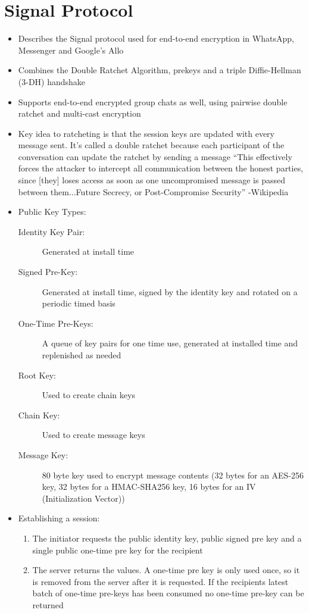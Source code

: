 \section{Signal Protocol}
\begin{itemize}
	\item Describes the Signal protocol used for end-to-end encryption in WhatsApp, Messenger and Google's Allo
	\item Combines the Double Ratchet Algorithm, prekeys and a triple Diffie-Hellman (3-DH) handshake
	\item Supports end-to-end encrypted group chats as well, using pairwise double ratchet and multi-cast encryption
	\item Key idea to ratcheting is that the session keys are updated with every message sent. It's called a double ratchet because each participant of the conversation can update the ratchet by sending a message
	\subitem ``This effectively forces the attacker to intercept all communication between the honest parties, since [they] loses access as soon as one uncompromised message is passed between them...Future Secrecy, or Post-Compromise Security'' -Wikipedia
	\item Public Key Types:
	\begin{description}
		\item[Identity Key Pair:] Generated at install time
		\item[Signed Pre-Key:] Generated at install time, signed by the identity key and rotated on a periodic timed basis
		\item[One-Time Pre-Keys:] A queue of key pairs for one time use, generated at installed time and replenished as needed
		\item[Root Key:] Used to create chain keys
		\item[Chain Key:] Used to create message keys
		\item[Message Key:] 80 byte key used to encrypt message contents (32 bytes for an AES-256 key, 32 bytes for a HMAC-SHA256 key, 16 bytes for an IV (Initialization Vector))
	\end{description}
	\item Establishing a session:
	\begin{enumerate}
		\item The initiator requests the public identity key, public signed pre key and a single public one-time pre key for the recipient
		\item The server returns the values. A one-time pre key is only used once, so it is removed from the server after it is requested. If the recipients latest batch of one-time pre-keys has been consumed no one-time pre-key can be returned

\end{enumerate}
\end{itemize}
